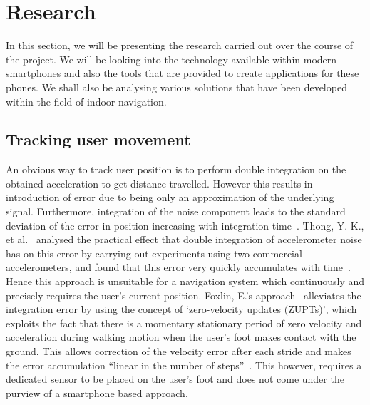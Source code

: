\documentclass[main.tex]{subfiles}
\begin{document}
\chapter*{Research}

In this section, we will be presenting the research carried out over the course of the project. We will be looking into the technology available within modern smartphones and also the tools that are provided to create applications for these phones. We shall also be analysing various solutions that have been developed within the field of indoor navigation.

 \section*{Tracking user movement}

An obvious way to track user position is to perform double integration on the obtained acceleration to get distance travelled. However this results in introduction of error due to being only an approximation of the underlying signal. Furthermore, integration of the noise component leads to the standard deviation of the error in position increasing with integration time~\cite[p.73]{integrationError}. Thong, Y. K., et al.~\cite{integrationErrorPractical} analysed the practical effect that double integration of accelerometer noise has on this error by carrying out experiments using two commercial accelerometers, and found that this error very quickly accumulates with time~\cite[p.1168]{integrationErrorPractical}. Hence this approach is unsuitable for a navigation system which continuously and precisely requires the user’s current position. Foxlin, E.'s approach~\cite{foxlin2005pedestrian} alleviates the integration error by using the concept of `zero-velocity updates (ZUPTs)’, which exploits the fact that there is a momentary stationary period of zero velocity and acceleration during walking motion when the user’s foot makes contact with the ground. This allows correction of the velocity error after each stride and makes the error accumulation ``linear in the number of steps''~\cite[p.38]{foxlin2005pedestrian}. This however, requires a dedicated sensor to be placed on the user’s foot and does not come under the purview of a smartphone based approach. 
\end{document}
